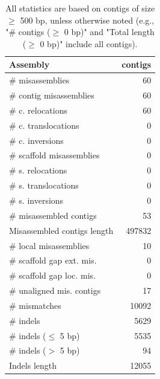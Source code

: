 \documentclass[12pt,a4paper]{article}
\begin{document}
\begin{table}[ht]
\begin{center}
\caption{All statistics are based on contigs of size $\geq$ 500 bp, unless otherwise noted (e.g., "\# contigs ($\geq$ 0 bp)" and "Total length ($\geq$ 0 bp)" include all contigs).}
\begin{tabular}{|l*{1}{|r}|}
\hline
Assembly & contigs \\ \hline
\# misassemblies & 60 \\ \hline
\hspace{2mm}\# contig misassemblies & 60 \\ \hline
\hspace{5mm}\# c. relocations & 60 \\ \hline
\hspace{5mm}\# c. translocations & 0 \\ \hline
\hspace{5mm}\# c. inversions & 0 \\ \hline
\hspace{2mm}\# scaffold misassemblies & 0 \\ \hline
\hspace{5mm}\# s. relocations & 0 \\ \hline
\hspace{5mm}\# s. translocations & 0 \\ \hline
\hspace{5mm}\# s. inversions & 0 \\ \hline
\# misassembled contigs & 53 \\ \hline
Misassembled contigs length & 497832 \\ \hline
\# local misassemblies & 10 \\ \hline
\# scaffold gap ext. mis. & 0 \\ \hline
\# scaffold gap loc. mis. & 0 \\ \hline
\# unaligned mis. contigs & 17 \\ \hline
\# mismatches & 10092 \\ \hline
\# indels & 5629 \\ \hline
\hspace{5mm}\# indels ($\leq$ 5 bp) & 5535 \\ \hline
\hspace{5mm}\# indels ($>$ 5 bp) & 94 \\ \hline
Indels length & 12055 \\ \hline
\end{tabular}
\end{center}
\end{table}
\end{document}
